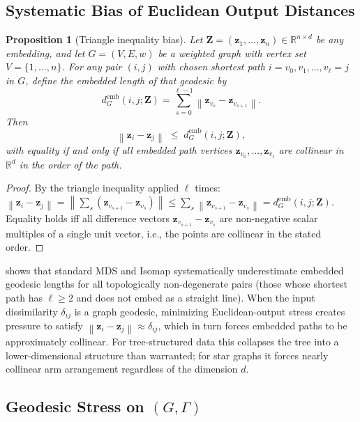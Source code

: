 \documentclass[11pt]{article}
\newcommand{\R}{\mathbb{R}}
\newcommand{\bz}{\mathbf{z}}
\newcommand{\bZ}{\mathbf{Z}}
\newcommand{\norm}[1]{\left\|#1\right\|}
\newcommand{\demb}{d^{\mathrm{emb}}}
\theoremstyle{definition}
\theoremstyle{plain}
\newtheorem{proposition}{Proposition}[section]
\theoremstyle{remark}
\begin{document}
\subsection{Systematic Bias of Euclidean Output Distances}
\label{sec:systematic_bias}

\begin{proposition}[Triangle inequality bias]
  \label{prop:bias}
  Let $\bZ = (\bz_1, \ldots, \bz_n) \in \R^{n \times d}$ be any embedding,
  and let $G = (V, E, w)$ be a weighted graph with vertex set $V = \{1,
  \ldots, n\}$.  For any pair $(i,j)$ with chosen shortest path
  $i = v_0, v_1, \ldots, v_\ell = j$ in $G$, define the embedded length of
  that geodesic by
  \begin{equation}
    \demb_G(i,j;\bZ)
    = \sum_{s=0}^{\ell-1} \norm{\bz_{v_s} - \bz_{v_{s+1}}}.
    \label{eq:emb_geo}
  \end{equation}
  Then
  \begin{equation}
    \norm{\bz_i - \bz_j} \;\leq\; \demb_G(i,j;\bZ),
    \label{eq:triangle_bias}
  \end{equation}
  with equality if and only if all embedded path vertices
  $\bz_{v_0}, \ldots, \bz_{v_\ell}$ are collinear in $\R^d$ in the order
  of the path.
\end{proposition}

\begin{proof}
  By the triangle inequality applied $\ell$ times:
  $\norm{\bz_i - \bz_j} = \norm{\sum_{s} (\bz_{v_{s+1}} - \bz_{v_s})}
  \leq \sum_s \norm{\bz_{v_{s+1}} - \bz_{v_s}} = \demb_G(i,j;\bZ)$.
  Equality holds iff all difference vectors $\bz_{v_{s+1}} - \bz_{v_s}$
  are non-negative scalar multiples of a single unit vector, i.e., the
  points are collinear in the stated order.
\end{proof}

 shows that standard MDS and Isomap systematically
underestimate embedded geodesic lengths for all topologically
non-degenerate pairs (those whose shortest path has $\ell \geq 2$ and
does not embed as a straight line).  When the input dissimilarity
$\delta_{ij}$ is a graph geodesic, minimizing Euclidean-output stress
creates pressure to satisfy $\norm{\bz_i - \bz_j} \approx \delta_{ij}$,
which in turn forces embedded paths to be approximately collinear.
For tree-structured data this collapses the tree into a lower-dimensional
structure than warranted; for star graphs it forces nearly collinear arm
arrangement regardless of the dimension $d$.

\subsection{Geodesic Stress on $(G,\Gamma)$}
\label{sec:geodesic_stress}
\end{document}
